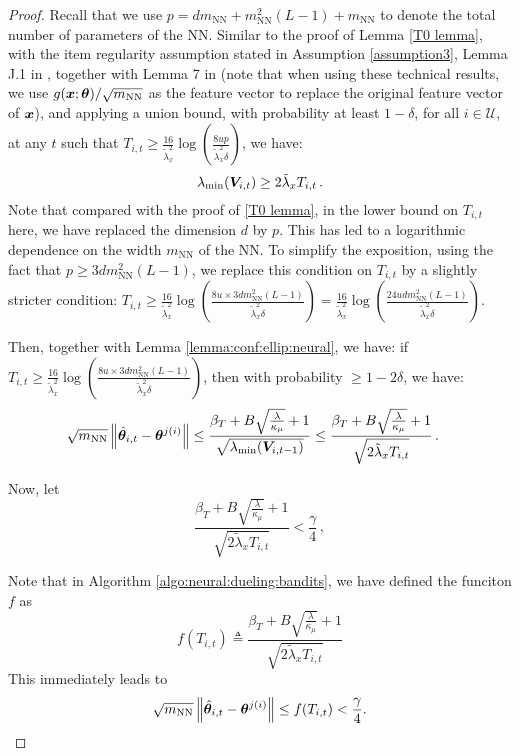 \begin{proof}
Recall that we use $p = dm_{\text{NN}} + m_{\text{NN}}^2(L-1) + m_{\text{NN}}$ to denote the total number of parameters of the NN.
Similar to the proof of Lemma \ref{T0 lemma}, with the item regularity assumption stated in Assumption \ref{assumption3}, Lemma J.1 in \cite{wang2024onlinea}, together with Lemma 7 in \cite{li2018online} (note that when using these technical results, we use $g(\boldsymbol{x};\boldsymbol{\theta})/\sqrt{m_{\text{NN}}}$ as the feature vector to replace the original feature vector of $\boldsymbol{x}$), and applying a union bound, with probability at least $1-\delta$, for all $i\in\mathcal{U}$, at any $t$ such that $T_{i,t}\geq\frac{16}{\tilde{\lambda}_x^2}\log(\frac{8up}{\tilde{\lambda}_x^2\delta})$, we have:
\begin{equation}
    \lambda_{\text{min}}(\boldsymbol{V}_{i,t})\geq2\tilde{\lambda}_x T_{i,t}\,.
    \label{min eigen}
\end{equation}
Note that compared with the proof of \ref{T0 lemma}, in the lower bound on $T_{i,t}$ here, we have replaced the dimension $d$ by $p$. This has led to a logarithmic dependence 
on the width $m_{\text{NN}}$ of the NN.
To simplify the exposition, using the fact that $p \geq 3dm_{\text{NN}}^2(L-1)$, we replace this condition on $T_{i,t}$ by a slightly stricter condition: $T_{i,t}\geq\frac{16}{\tilde{\lambda}_x^2}\log(\frac{8u \times 3dm_{\text{NN}}^2(L-1)}{\tilde{\lambda}_x^2\delta}) = \frac{16}{\tilde{\lambda}_x^2}\log(\frac{24u d m_{\text{NN}}^2(L-1)}{\tilde{\lambda}_x^2\delta})$.

Then, together with Lemma \ref{lemma:conf:ellip:neural}, we have: if 
$T_{i,t}\geq\frac{16}{\tilde{\lambda}_x^2}\log(\frac{8u \times 3dm_{\text{NN}}^2(L-1)}{\tilde{\lambda}_x^2\delta})$, 
then with probability $\geq 1-2\delta$, we have:
\begin{align}
    \sqrt{m_{\text{NN}}} \left\| \hat{\boldsymbol{\theta}}_{i,t}-\boldsymbol{\theta}^{j(i)} \right\|
    &\leq \frac{\beta_T + B \sqrt{\frac{\lambda}{\kappa_\mu}} + 1}{\sqrt{\lambda_{\min}(\boldsymbol{V}_{i,t-1})}} \leq \frac{\beta_T + B \sqrt{\frac{\lambda}{\kappa_\mu}} + 1}{\sqrt{2\tilde{\lambda}_x T_{i,t}}}\notag\,.
\end{align}

Now, let
\begin{equation}
    \frac{\beta_T + B \sqrt{\frac{\lambda}{\kappa_\mu}} + 1}{\sqrt{2\tilde{\lambda}_x T_{i,t}}}<\frac{\gamma}{4}\,,
\end{equation}

Note that in Algorithm \ref{algo:neural:dueling:bandits}, we have defined the funciton $f$ as 
\begin{equation}
f(T_{i,t}) \triangleq \frac{\beta_T + B \sqrt{\frac{\lambda}{\kappa_\mu}} + 1}{\sqrt{2\tilde{\lambda}_x T_{i,t}}}
\end{equation}
This immediately leads to
\begin{equation}
\sqrt{m_{\text{NN}}} \left\| \hat{\boldsymbol{\theta}}_{i,t}-\boldsymbol{\theta}^{j(i)} \right\| \leq f(T_{i,t}) < \frac{\gamma}{4}.
\end{equation}


\end{proof}
